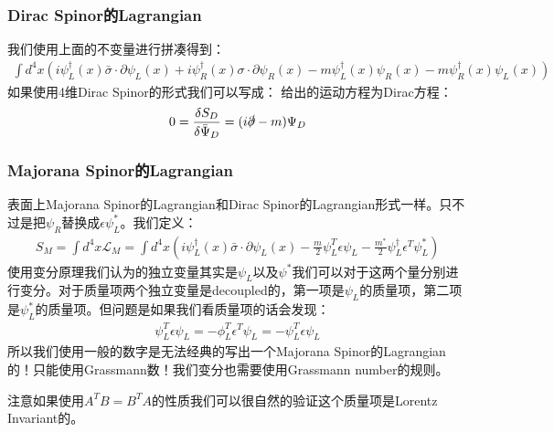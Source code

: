 \subsubsection{Dirac Spinor的Lagrangian}

我们使用上面的不变量进行拼凑得到：
\begin{align}
  \int
  d^4x\left(i\psi_L^\dagger(x)\bar{\sigma}\cdot\partial\psi_L(x)+i\psi_R^\dagger(x)\sigma\cdot\partial\psi_R(x)-m\psi_L^\dagger(x)\psi_R(x)-m\psi_R^\dagger(x)\psi_L(x)\right)
\end{align}
如果使用4维Dirac Spinor的形式我们可以写成：
给出的运动方程为Dirac方程：
\begin{align}
  0=\frac{\delta S_D}{\delta\bar{\Psi}_D}=(i\slashed{\partial}-m)\Psi_D
\end{align}

\subsubsection{Majorana Spinor的Lagrangian}

表面上Majorana Spinor的Lagrangian和Dirac Spinor的Lagrangian形式一样。只不过是把$
\psi_R $替换成$ \epsilon\psi_L^* $。我们定义：
\begin{align}
  S_M=\int d^4x\mathcal{L}_M=\int
  d^4x\left(i\psi_L^\dagger(x)\bar{\sigma}\cdot\partial\psi_L(x)-\frac{m}{2}\psi_L^T\epsilon\psi_L-\frac{m^*}{2}\psi_L^\dagger\epsilon^T\psi_L^*\right)
\end{align}
使用变分原理我们认为的独立变量其实是$ \psi_L $以及$ \psi^*
$我们可以对于这两个量分别进行变分。对于质量项两个独立变量是decoupled的，第一项是$ \psi_L $的质量项，第二项是$
\psi_L^* $的质量项。但问题是如果我们看质量项的话会发现：
\begin{align}
  \psi_L^T\epsilon\psi_L = - \phi_L^T \epsilon^T \psi_L =  -
  \psi_L^T\epsilon\psi_L
\end{align}
所以我们使用一般的数字是无法经典的写出一个Majorana
Spinor的Lagrangian的！只能使用Grassmann数！我们变分也需要使用Grassmann number的规则。

注意如果使用$ A^T B = B^T A $的性质我们可以很自然的验证这个质量项是Lorentz Invariant的。

